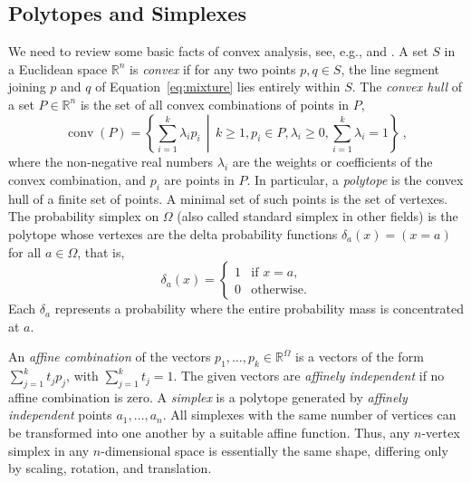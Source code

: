 \documentclass[axioms,article,submit,pdftex,moreauthors]{Definitions/mdpi}
\theoremstyle{plain}
\theoremstyle{remark}
\newcommand{\reals}{\mathbb{R}}
\newcommand{\setof}[2]{\left\{#1 \, \middle| \, #2 \right\}}
\begin{document}
\subsection{Polytopes and Simplexes} \label{sec:polytopes}

We need to review some basic facts of convex analysis, see, e.g., \cite{barvinok:2002} and \cite{lay2007convex}. A set $S$ in a Euclidean space  $\mathbb{R}^n$ is \emph{convex} if for any two points  $p,q \in S$, the line segment joining  $p$ and $q$ of Equation~\eqref{eq:mixture} lies entirely within $S$. The \emph{convex hull} of a set $P \in \reals^n$ is the set of all convex combinations of points in  $P$,
\begin{equation*}
    \operatorname{conv}(P) = \setof{ \sum_{i=1}^{k} \lambda_i {p}_i}{k \ge 1, {p}_i \in P, \lambda_i \geq 0, \sum_{i=1}^{k} \lambda_i = 1} \ , 
\end{equation*}
where the non-negative real numbers $\lambda_i$ are the weights or coefficients of the convex combination, and  ${p}_i$  are points in $P$. %
In particular, a \emph{polytope} is the convex hull of a finite set of points. A minimal set of such points is the set of vertexes. %
The probability simplex on $\Omega$ (also called standard simplex in other fields) is the polytope whose vertexes are the delta probability functions $\delta_a(x) = (x=a)$ for all $a\in \Omega$, that is,
\begin{equation}
\delta_a(x) = \begin{cases} 
1 & \text{if } x = a, \\
0 & \text{otherwise}.
\end{cases}
\end{equation}
Each \(\delta_a\) represents a probability where the entire probability mass is concentrated at \(a\).

An \emph{affine combination} of the vectors $p_1,\dots,p_k \in \reals^\Omega$ is a vectors of the form $\sum_{j=1}^k t_j p_j$, with $\sum_{j=1}^k t_j = 1$. The given vectors are \emph{affinely independent} if no affine combination is zero. A \emph{simplex} is a polytope generated by \emph{affinely independent} points $a_1,\dots,a_n$. All simplexes with the same number of vertices can be transformed into one another by a suitable affine function. Thus, any \(n\)-vertex simplex in any \(n\)-dimensional space is essentially the same shape, differing only by scaling, rotation, and translation.
\end{document}
